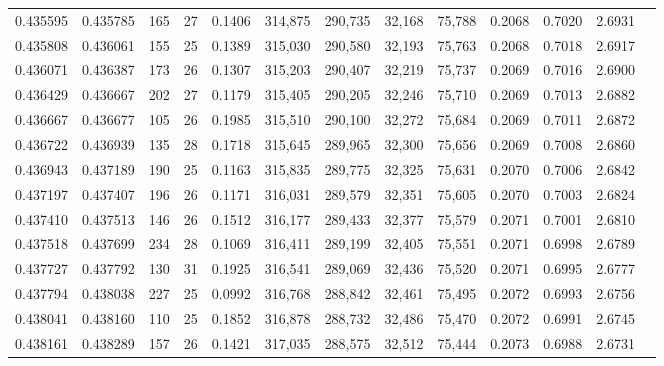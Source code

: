 \begin{tabular}{rrrrrrrrrrrrr}
0.435595 & 0.435785 &    165 &    27 &                                     0.1406 & 314,875 & 290,735 &  32,168 &  75,788 & 0.2068 & 0.7020 & 2.6931 \\
0.435808 & 0.436061 &    155 &    25 &                                     0.1389 & 315,030 & 290,580 &  32,193 &  75,763 & 0.2068 & 0.7018 & 2.6917 \\
0.436071 & 0.436387 &    173 &    26 &                                     0.1307 & 315,203 & 290,407 &  32,219 &  75,737 & 0.2069 & 0.7016 & 2.6900 \\
0.436429 & 0.436667 &    202 &    27 &                                     0.1179 & 315,405 & 290,205 &  32,246 &  75,710 & 0.2069 & 0.7013 & 2.6882 \\
0.436667 & 0.436677 &    105 &    26 &                                     0.1985 & 315,510 & 290,100 &  32,272 &  75,684 & 0.2069 & 0.7011 & 2.6872 \\
0.436722 & 0.436939 &    135 &    28 &                                     0.1718 & 315,645 & 289,965 &  32,300 &  75,656 & 0.2069 & 0.7008 & 2.6860 \\
0.436943 & 0.437189 &    190 &    25 &                                     0.1163 & 315,835 & 289,775 &  32,325 &  75,631 & 0.2070 & 0.7006 & 2.6842 \\
0.437197 & 0.437407 &    196 &    26 &                                     0.1171 & 316,031 & 289,579 &  32,351 &  75,605 & 0.2070 & 0.7003 & 2.6824 \\
0.437410 & 0.437513 &    146 &    26 &                                     0.1512 & 316,177 & 289,433 &  32,377 &  75,579 & 0.2071 & 0.7001 & 2.6810 \\
0.437518 & 0.437699 &    234 &    28 &                                     0.1069 & 316,411 & 289,199 &  32,405 &  75,551 & 0.2071 & 0.6998 & 2.6789 \\
0.437727 & 0.437792 &    130 &    31 &                                     0.1925 & 316,541 & 289,069 &  32,436 &  75,520 & 0.2071 & 0.6995 & 2.6777 \\
0.437794 & 0.438038 &    227 &    25 &                                     0.0992 & 316,768 & 288,842 &  32,461 &  75,495 & 0.2072 & 0.6993 & 2.6756 \\
0.438041 & 0.438160 &    110 &    25 &                                     0.1852 & 316,878 & 288,732 &  32,486 &  75,470 & 0.2072 & 0.6991 & 2.6745 \\
0.438161 & 0.438289 &    157 &    26 &                                     0.1421 & 317,035 & 288,575 &  32,512 &  75,444 & 0.2073 & 0.6988 & 2.6731 \\

\end{tabular}
